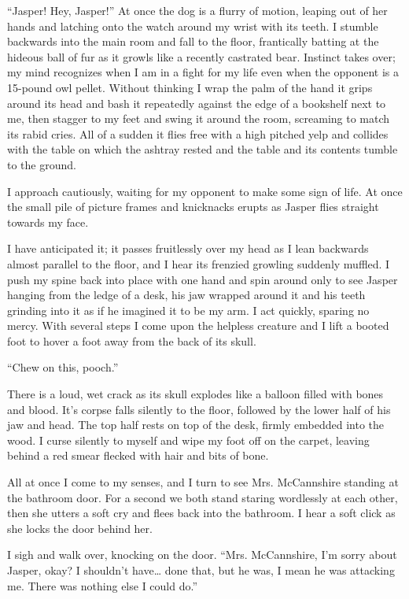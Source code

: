 ``Jasper! Hey, Jasper!'' At once the dog is a flurry of motion, leaping
out of her hands and latching onto the watch around my wrist with its
teeth. I stumble backwards into the main room and fall to the floor,
frantically batting at the hideous ball of fur as it growls like a
recently castrated bear. Instinct takes over; my mind recognizes when I
am in a fight for my life even when the opponent is a 15-pound owl
pellet. Without thinking I wrap the palm of the hand it grips around its
head and bash it repeatedly against the edge of a bookshelf next to me,
then stagger to my feet and swing it around the room, screaming to match
its rabid cries. All of a sudden it flies free with a high pitched yelp
and collides with the table on which the ashtray rested and the table
and its contents tumble to the ground.

I approach cautiously, waiting for my opponent to make some sign of
life. At once the small pile of picture frames and knicknacks erupts as
Jasper flies straight towards my face.

I have anticipated it; it passes fruitlessly over my head as I lean
backwards almost parallel to the floor, and I hear its frenzied growling
suddenly muffled. I push my spine back into place with one hand and spin
around only to see Jasper hanging from the ledge of a desk, his jaw
wrapped around it and his teeth grinding into it as if he imagined it to
be my arm. I act quickly, sparing no mercy. With several steps I come
upon the helpless creature and I lift a booted foot to hover a foot away
from the back of its skull.

``Chew on this, pooch.''

There is a loud, wet crack as its skull explodes like a balloon filled
with bones and blood. It's corpse falls silently to the floor, followed
by the lower half of his jaw and head. The top half rests on top of the
desk, firmly embedded into the wood. I curse silently to myself and wipe
my foot off on the carpet, leaving behind a red smear flecked with hair
and bits of bone.

All at once I come to my senses, and I turn to see Mrs. McCannshire
standing at the bathroom door. For a second we both stand staring
wordlessly at each other, then she utters a soft cry and flees back into
the bathroom. I hear a soft click as she locks the door behind her.

I sigh and walk over, knocking on the door. ``Mrs. McCannshire, I'm sorry
about Jasper, okay? I shouldn't have\ldots{} done that, but he was, I mean he
was attacking me. There was nothing else I could do.''

